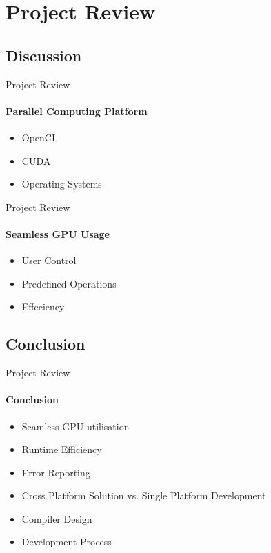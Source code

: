 \section{Project Review}

	\subsection{Discussion}
	\begin{frame}[t]{Project Review}\framesubtitle{Parallel Computing Platform}
		\begin{itemize}
			\item OpenCL
			\item CUDA
			\item Operating Systems
		\end{itemize}
	\end{frame}

	\begin{frame}[t]{Project Review}\framesubtitle{Seamless GPU Usage}
		\begin{itemize}
			\item User Control
			\item Predefined Operations
			\item Effeciency
		\end{itemize}
	\end{frame}

	\subsection{Conclusion}
	\begin{frame}[t]{Project Review}\framesubtitle{Conclusion}
		\begin{itemize}
			\item Seamless GPU utilisation
			\item Runtime Efficiency
			\item Error Reporting
			\item Cross Platform Solution vs. Single Platform Development %
			\item Compiler Design
			\item Development Process
		\end{itemize}
	\end{frame}

